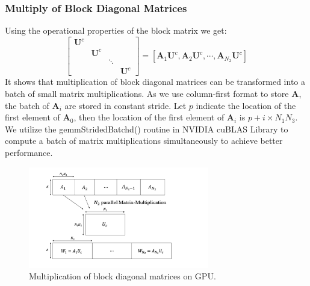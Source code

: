 \documentclass[futureinternet,article,submit,moreauthors,pdftex,10pt,a4paper]{Definitions/mdpi}
\theoremstyle{plain}
\theoremstyle{definition}
\theoremstyle{remark}
\begin{document}
\subsubsection{Multiply of Block Diagonal Matrices}
Using the operational properties of the block matrix we get:
\begin{equation}
        [\mathbf{A}_1, \mathbf{A}_2, \cdots, \mathbf{A}_{N_2}]
        \begin{bmatrix}
            \mathbf{U}^c & & & \\
            & \mathbf{U}^c & & \\
            & & \ddots & \\
            & & & \mathbf{U}^c
        \end{bmatrix}
        =
        [\mathbf{A}_1\mathbf{U}^c, \mathbf{A}_2\mathbf{U}^c, \cdots, \mathbf{A}_{N_2}\mathbf{U}^c]
\label{step1}
\end{equation}
It shows that multiplication of block diagonal matrices can be transformed into a batch of small matrix multiplications. As we use column-first format to store $\mathbf{A}$, the batch of $\mathbf{A}_i$ are stored in constant stride. Let $p$ indicate the location of the first element of $\mathbf{A}_0$, then the location of the first element of $\mathbf{A}_i$ is $p+i\times N_1N_3$.  We utilize the gemmStridedBatchd() routine in NVIDIA cuBLAS Library to compute a batch of matrix multiplications simultaneously to achieve better performance.
\begin{figure}[H]
\centering
\includegraphics[width=0.7\textwidth]{diagMM.pdf}
\caption{Multiplication of block diagonal matrices on GPU.}
\label{Fig:diagMM}
\end{figure}
\end{document}
